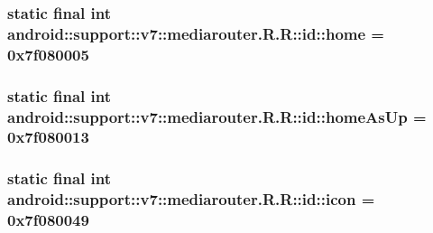 \hypertarget{classandroid_1_1support_1_1v7_1_1mediarouter_1_1_r_1_1id_2f3c7d4e1bc0dfd9b64e8d83453f3a6f}{
\subsubsection[{home}]{\setlength{\rightskip}{0pt plus 5cm}static final int android::support::v7::mediarouter.R.R::id::home = 0x7f080005}}
\label{classandroid_1_1support_1_1v7_1_1mediarouter_1_1_r_1_1id_2f3c7d4e1bc0dfd9b64e8d83453f3a6f}


\hypertarget{classandroid_1_1support_1_1v7_1_1mediarouter_1_1_r_1_1id_1dd55a86575c337ffb6adb669c0fb9ca}{
\subsubsection[{homeAsUp}]{\setlength{\rightskip}{0pt plus 5cm}static final int android::support::v7::mediarouter.R.R::id::homeAsUp = 0x7f080013}}
\label{classandroid_1_1support_1_1v7_1_1mediarouter_1_1_r_1_1id_1dd55a86575c337ffb6adb669c0fb9ca}


\hypertarget{classandroid_1_1support_1_1v7_1_1mediarouter_1_1_r_1_1id_cbf074f8c10ace0794f813d8440d6ea6}{
\subsubsection[{icon}]{\setlength{\rightskip}{0pt plus 5cm}static final int android::support::v7::mediarouter.R.R::id::icon = 0x7f080049}}
\label{classandroid_1_1support_1_1v7_1_1mediarouter_1_1_r_1_1id_cbf074f8c10ace0794f813d8440d6ea6}


